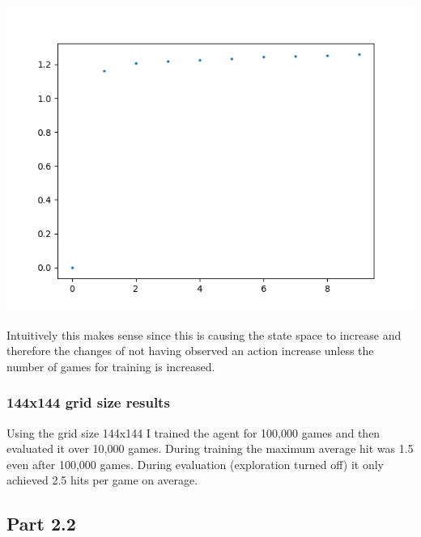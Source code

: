 \documentclass[11pt]{article}
\begin{document}
\begin{multicols}{2}
\includegraphics[scale=0.5]{part2.1/144x144.png}
\end{multicols}

Intuitively this makes sense since this is causing the state space to increase and therefore the changes of not having observed an action increase unless the number of games for training is increased.

\subsubsection*{144x144 grid size results}
Using the grid size 144x144 I trained the agent for 100,000 games and then evaluated it over 10,000 games. During training the maximum average hit was 1.5 even after 100,000 games. During evaluation (exploration turned off) it only achieved 2.5 hits per game on average.

\subsection*{Part 2.2}
\end{document}
